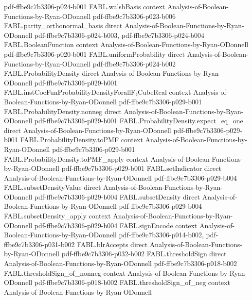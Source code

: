 \begin{theorem}
  {pdf-ffbe9c7b3306-p024-b001}
\proofstep
  {FABL.walshBasis}
  {context}
  {Analysis-of-Boolean-Functions-by-Ryan-ODonnell}
  {pdf-ffbe9c7b3306-p023-b006}
\proofstep
  {FABL.parity_orthonormal_basis}
  {direct}
  {Analysis-of-Boolean-Functions-by-Ryan-ODonnell}
  {pdf-ffbe9c7b3306-p024-b003,
    pdf-ffbe9c7b3306-p024-b004}
\proofstep
  {FABL.BooleanFunction}
  {context}
  {Analysis-of-Boolean-Functions-by-Ryan-ODonnell}
  {pdf-ffbe9c7b3306-p020-b001}
\proofstep
  {FABL.uniformProbability}
  {direct}
  {Analysis-of-Boolean-Functions-by-Ryan-ODonnell}
  {pdf-ffbe9c7b3306-p024-b002}
\proofstep
  {FABL.ProbabilityDensity}
  {direct}
  {Analysis-of-Boolean-Functions-by-Ryan-ODonnell}
  {pdf-ffbe9c7b3306-p029-b001}
\proofstep
  {FABL.instCoeFunProbabilityDensityForallF₂CubeReal}
  {context}
  {Analysis-of-Boolean-Functions-by-Ryan-ODonnell}
  {pdf-ffbe9c7b3306-p029-b001}
\proofstep
  {FABL.ProbabilityDensity.nonneg}
  {direct}
  {Analysis-of-Boolean-Functions-by-Ryan-ODonnell}
  {pdf-ffbe9c7b3306-p029-b001}
\proofstep
  {FABL.ProbabilityDensity.expect_eq_one}
  {direct}
  {Analysis-of-Boolean-Functions-by-Ryan-ODonnell}
  {pdf-ffbe9c7b3306-p029-b001}
\proofstep
  {FABL.ProbabilityDensity.toPMF}
  {context}
  {Analysis-of-Boolean-Functions-by-Ryan-ODonnell}
  {pdf-ffbe9c7b3306-p029-b001}
\proofstep
  {FABL.ProbabilityDensity.toPMF_apply}
  {context}
  {Analysis-of-Boolean-Functions-by-Ryan-ODonnell}
  {pdf-ffbe9c7b3306-p029-b001}
\proofstep
  {FABL.setIndicator}
  {direct}
  {Analysis-of-Boolean-Functions-by-Ryan-ODonnell}
  {pdf-ffbe9c7b3306-p029-b004}
\proofstep
  {FABL.subsetDensityValue}
  {direct}
  {Analysis-of-Boolean-Functions-by-Ryan-ODonnell}
  {pdf-ffbe9c7b3306-p029-b004}
\proofstep
  {FABL.subsetDensity}
  {direct}
  {Analysis-of-Boolean-Functions-by-Ryan-ODonnell}
  {pdf-ffbe9c7b3306-p029-b004}
\proofstep
  {FABL.subsetDensity_apply}
  {context}
  {Analysis-of-Boolean-Functions-by-Ryan-ODonnell}
  {pdf-ffbe9c7b3306-p029-b004}
\proofstep
  {FABL.signEncode}
  {context}
  {Analysis-of-Boolean-Functions-by-Ryan-ODonnell}
  {pdf-ffbe9c7b3306-p014-b002,
    pdf-ffbe9c7b3306-p031-b002}
\proofstep
  {FABL.blrAccepts}
  {direct}
  {Analysis-of-Boolean-Functions-by-Ryan-ODonnell}
  {pdf-ffbe9c7b3306-p032-b002}
\proofstep
  {FABL.thresholdSign}
  {direct}
  {Analysis-of-Boolean-Functions-by-Ryan-ODonnell}
  {pdf-ffbe9c7b3306-p018-b002}
\proofstep
  {FABL.thresholdSign_of_nonneg}
  {context}
  {Analysis-of-Boolean-Functions-by-Ryan-ODonnell}
  {pdf-ffbe9c7b3306-p018-b002}
\proofstep
  {FABL.thresholdSign_of_neg}
  {context}
  {Analysis-of-Boolean-Functions-by-Ryan-ODonnell}

\end{theorem}
